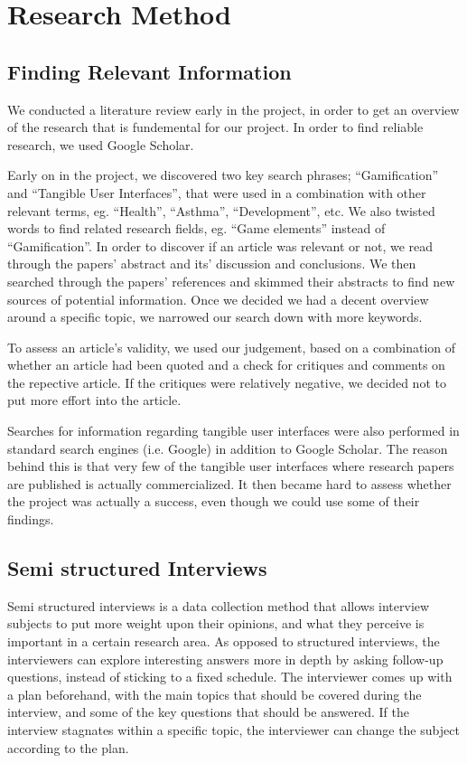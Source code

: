\chapter{Research Method}
\label{sec:researchmethod}


\section{Finding Relevant Information}

We conducted a literature review early in the project, in order to get an overview of the research that is fundemental for our project. In order to find reliable research, we used Google Scholar. 

Early on in the project, we discovered two key search phrases; ``Gamification'' and ``Tangible User Interfaces'', that were used in a combination with other relevant terms, eg. ``Health'', ``Asthma'', ``Development'', etc. We also twisted words to find related research fields, eg. ``Game elements'' instead of ``Gamification''. 
In order to discover if an article was relevant or not, we read through the papers' abstract and its' discussion and conclusions. We then searched through the papers' references and skimmed their abstracts to find new sources of potential information. Once we decided we had a decent overview around a specific topic, we narrowed our search down with more keywords.

To assess an article's validity, we used our judgement, based on a combination of whether an article had been quoted and a check for critiques and comments on the repective article. If the critiques were relatively negative, we decided not to put more effort into the article. 

Searches for information regarding tangible user interfaces were also performed in standard search engines (i.e. Google) in addition to Google Scholar. The reason behind this is that very few of the tangible user interfaces where research papers are published is actually commercialized. It then became hard to assess whether the project was actually a success, even though we could use some of their findings.      
 
\section{Semi structured Interviews}

Semi structured interviews is a data collection method that allows interview subjects to put more weight upon their opinions, and what they perceive is important in a certain research area. As opposed to structured interviews, the interviewers can explore interesting answers more in depth by asking follow-up questions, instead of sticking to a fixed schedule. The interviewer comes up with a plan beforehand, with the main topics that should be covered during the interview, and some of the key questions that should be answered. If the interview stagnates within a specific topic, the interviewer can change the subject according to the plan.

